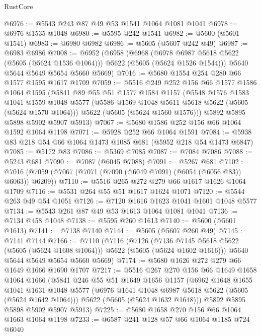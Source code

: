 \begin{lexlean}{RustCore}
\begin{coremodule}
@6976 := @5543 @243 @87 @49 @53 @1541 @1064 @1081 @1041
@6978 := @6976 @1535 @1048
@6980 := @5595 @242 @1541
@6982 := @5600 (@5601 @1541)
@6983 := @6980 @6982
@6986 := @5605 (@5607 @242 @49)
@6987 := @6983 @6986
@7008 := @6952
    (@6958
      (@6968
        (@6978 @6987 @5618 @5622 (@5605 (@5624 @1536 @1064)))
        @5622
        (@5605 (@5624 @1526 @1544)))
      @5640
      @5644
      @5649
      @5654
      @5660
      @5669)
@7016 := @5680 @1554 @254 @280 @66 @1577 @1595 @1617 @1709
@7059 := @5516
    @249
    @252
    @156
    @66
    @1577
    @1586
    @1064
    @1595
    (@5841
      @89
      @55
      @51
      @1577
      @1584
      @1157
      (@5548
        @1576
        @1583
        @1041
        @1559
        @1048
        @5577
        (@5586 @1569 @1048 @5611 @5618 @5622 (@5605 (@5624 @1570 @1064)))
        @5622
        (@5605 (@5624 @1560 @1576)))
      @5892
      @5895
      @5898
      @5902
      @5907
      @5913)
@7067 := @5680 @1586 @252 @156 @66 @1064 @1592 @1064 @1198
@7071 := @5928 @252 @66 @1064 @1591
@7084 := @5938 @83 @218 @54 @66 @1064 @1473 @1085 @681 (@5952 @218 @54 @1473 @6847)
@7085 := @5172 @83
@7086 := @5369 @7085
@7087 := @7084 @7086
@7088 := @5243 @681
@7090 := @7087 (@6045 @7088)
@7091 := @5267 @681
@7102 := @7016 (@7059 (@7067 (@7071 (@7090 (@6049 @7091) (@6054 (@6056 @83)) @6063)) @6209))
@7110 := @5516 @265 @272 @279 @66 @1617 @1626 @1064 @1709
@7116 := @5531 @264 @55 @51 @1617 @1624 @1071
@7120 := @5544 @263 @49 @54 @1051
@7126 := @7120 @1616 @1623 @1041 @1601 @1048 @5577
@7134 := @5543 @261 @87 @49 @53 @1613 @1064 @1081 @1041
@7136 := @7134 @458 @1048
@7138 := @5595 @260 @1613
@7140 := @5600 (@5601 @1613)
@7141 := @7138 @7140
@7144 := @5605 (@5607 @260 @49)
@7145 := @7141 @7144
@7166 := @7110
    (@7116
      (@7126
        (@7136 @7145 @5618 @5622 (@5605 (@5624 @1608 @1064)))
        @5622
        (@5605 (@5624 @1602 @1616)))
      @5640
      @5644
      @5649
      @5654
      @5660
      @5669)
@7174 := @5680 @1626 @272 @279 @66 @1649 @1666 @1690 @1707
@7217 := @5516
    @267
    @270
    @156
    @66
    @1649
    @1658
    @1064
    @1666
    (@5841
      @246
      @55
      @51
      @1649
      @1656
      @1157
      (@6962
        @1648
        @1655
        @1041
        @1631
        @1048
        @5577
        (@6976 @1641 @1048 @6987 @5618 @5622 (@5605 (@5624 @1642 @1064)))
        @5622
        (@5605 (@5624 @1632 @1648)))
      @5892
      @5895
      @5898
      @5902
      @5907
      @5913)
@7225 := @5680 @1658 @270 @156 @66 @1064 @1663 @1064 @1198
@7233 := @6587 @241 @128 @57 @66 @1064 @1185 @724 @6040

\end{coremodule}
\end{lexlean}
